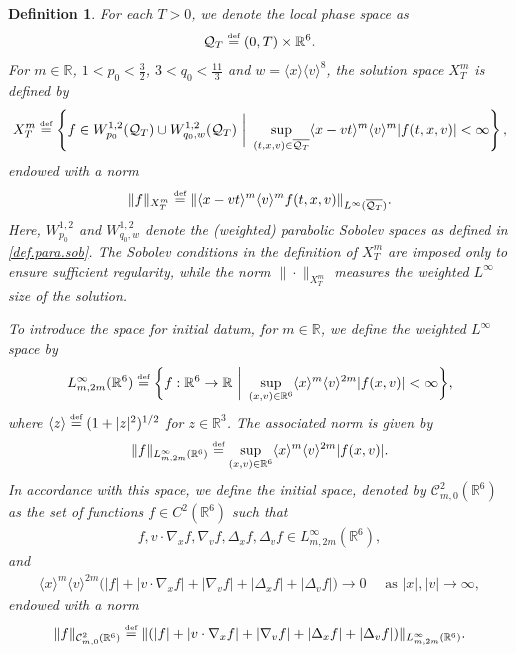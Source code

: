 \documentclass[reqno,11pt,final]{amsart}
\theoremstyle{plain}
\newtheorem{definition}[theorem]{Definition}
\numberwithin{equation}{section}
\numberwithin{theorem}{section}
\newcommand{\eqdef }{\overset{\mbox{\tiny{def}}}{=}}
\begin{document}
\begin{definition}For each $T>0$, we denote the local phase space as
    \begin{align*}
            \mathcal{Q}_T \eqdef (0,T)\times\mathbb{R}^6.
     \end{align*}For $m\in\mathbb{R}$, $1<p_0<\frac{3}{2}$, $3<q_0<\frac{11}{3}$ and $w=\langle x\rangle\langle v\rangle^8$, the solution space $X_T^m$ is defined by
    \begin{align*}
            X_T^m  \eqdef \left\{f \in W_{p_0}^{1,2}(\mathcal{Q}_T)\cup W_{q_0,w}^{1,2}(\mathcal{Q}_T) \ \bigg|\  \sup_{(t,x,v)\in \overline{\mathcal{Q}_T}} \langle x-vt\rangle^m\langle v\rangle^m|f(t,x,v)|<\infty\right\},
    \end{align*}endowed with a norm
    \begin{align*}
            \lVert f\rVert_{X_T^m} \eqdef \lVert \langle x-vt\rangle^m\langle v\rangle^m f(t,x,v)\rVert_{L^\infty(\overline{\mathcal{Q}_T})}.
    \end{align*}Here, $W_{p_0}^{1,2}$ and $W_{q_0,w}^{1,2}$ denote the (weighted) parabolic Sobolev spaces as defined in \eqref{def.para.sob}. The Sobolev conditions in the definition of $X_T^m$ are imposed only to ensure sufficient regularity, while the norm $\|\cdot\|_{X_T^m}$ measures the weighted $L^\infty$ size of the solution.
    
To introduce the space for initial datum, for $m\in\mathbb{R}$, we define the weighted $L^\infty$ space by
\begin{align*}
    L^\infty_{m,2m}(\mathbb{R}^6) \eqdef \biggl\{f : \mathbb{R}^6\to\mathbb{R}\ \bigg|\ \sup_{(x,v)\in\mathbb{R}^6}\langle x\rangle^m \langle v\rangle^{2m}|f(x,v)|<\infty\biggr\},
\end{align*}where $\langle z\rangle \eqdef (1+|z|^2)^{1/2}$ for $z\in\mathbb{R}^3$. The associated norm is given by
\begin{align*}
    \lVert f\rVert_{L^\infty_{m,2m}(\mathbb{R}^6)} \eqdef \sup_{(x,v)\in\mathbb{R}^6} \langle x\rangle^m\langle v\rangle^{2m} |f(x,v)|.
\end{align*}In accordance with this space, we define the initial space, denoted by $\mathcal{C}^2_{m,0}(\mathbb{R}^6)$ as the set of functions $f\in C^2(\mathbb{R}^6)$ such that
\begin{align*}
    f,v\cdot\nabla_xf,\nabla_vf, \Delta_xf, \Delta_vf\in L^\infty_{m,2m}(\mathbb{R}^6),
\end{align*}and
\begin{align*}
    \langle x\rangle^m\langle v\rangle^{2m}\big(|f|+|v\cdot\nabla_xf| + |\nabla_vf| + |\Delta_xf| + |\Delta_vf|\big)\to0 \quad \text{ as }|x|,|v|\to\infty,
\end{align*}endowed with a norm
\begin{align*}
    \|f\|_{\mathcal{C}^2_{m,0}(\mathbb{R}^6)} \eqdef \|(|f| + |v\cdot\nabla_xf| + |\nabla_vf| + |\Delta_xf| + |\Delta_vf|)\|_{L^\infty_{m,2m}(\mathbb{R}^6)}.
\end{align*}


\end{definition}
\end{document}

